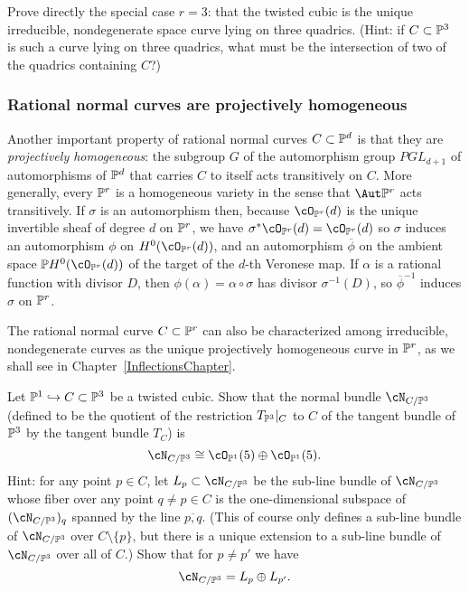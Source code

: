 \begin{exercise}
Prove directly  the special case $r=3$: that the twisted cubic is the unique irreducible, nondegenerate space curve lying on three quadrics. (Hint: if $C \subset \PP^3$ is such a curve lying on three quadrics, what must be the intersection of two of the quadrics containing $C$?)
\end{exercise}

\subsubsection{Rational normal curves are projectively homogeneous}

Another important property of rational normal curves $C \subset \PP^d$ is that they are \emph{projectively homogeneous}: the subgroup $G$ of the automorphism group $PGL_{d+1}$ of automorphisms of $\PP^d$ that carries $C$ to itself acts transitively on $C$. More generally,
every $\PP^r$ is a homogeneous variety in the sense that $\Aut \PP^r$ acts transitively. If $\sigma$ is an automorphism then,
 because $\cO_{\PP^r}(d)$ is the unique
invertible sheaf of degree $d$ on $\PP^r$,  we have $\sigma^*\cO_{\PP^r}(d) = \cO_{\PP^r}(d)$ so $\sigma$ induces an automorphism $\phi$ on $H^0(\cO_{\PP^r}(d))$, and an automorphism $\overline \phi$ on the ambient space $\PP H^0(\cO_{\PP^r}(d))$ of the target of the $d$-th Veronese map. If $\alpha$
is a rational function with divisor $D$, then $\phi(\alpha) = \alpha\circ \sigma$ has divisor $\sigma^{-1}(D)$, so $\overline\phi^{-1}$ induces $\sigma$ on $\PP^r$. 

The rational normal curve $C \subset \PP^r$ can also be characterized among irreducible, nondegenerate curves as the unique projectively homogeneous curve in $\PP^r$, as we shall see in Chapter~\ref{InflectionsChapter}.

\begin{exercise}
Let $\PP^1 \hookrightarrow C \subset \PP^3$ be a twisted cubic. Show that the normal bundle $\cN_{C/\PP^3}$ (defined to be the quotient of the restriction $T_{\PP^3}|_C$ to $C$ of the tangent bundle  of $\PP^3$  by the tangent bundle $T_C$) is 
$$
\cN_{C/\PP^3} \cong \cO_{\PP^1}(5) \oplus  \cO_{\PP^1}(5).
$$
Hint: for any point $p \in C$, let $L_p \subset \cN_{C/\PP^3}$ be the sub-line bundle of $\cN_{C/\PP^3}$ whose fiber over any point $q \neq p \in C$ is the one-dimensional subspace of $(\cN_{C/\PP^3})_q$ spanned by the line $\overline{p,q}$. (This of course only defines a sub-line bundle of $\cN_{C/\PP^3}$ over $C \setminus \{p\}$, but there is a unique extension to a sub-line bundle of $\cN_{C/\PP^3}$ over all of $C$.) Show that for $p \neq p'$ we have
$$
\cN_{C/\PP^3} = L_p \oplus L_{p'}.
$$
\end{exercise}

